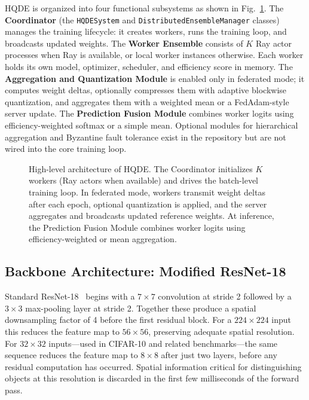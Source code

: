\documentclass[journal,twoside]{IEEEtran}
\newcommand{\hqde}{\mbox{HQDE}\xspace}
\begin{document}
\hqde{} is organized into four functional subsystems as shown in
Fig.~\ref{fig:arch}. The \textbf{Coordinator} (the \texttt{HQDESystem}
and \texttt{DistributedEnsembleManager} classes) manages the training
lifecycle: it creates workers, runs the training loop, and broadcasts
updated weights. The \textbf{Worker Ensemble} consists of $K$ Ray actor
processes when Ray is available, or local worker instances otherwise.
Each worker holds its own model, optimizer, scheduler, and efficiency
score in memory. The \textbf{Aggregation and Quantization Module} is
enabled only in federated mode; it computes weight deltas, optionally
compresses them with adaptive blockwise quantization, and aggregates them
with a weighted mean or a FedAdam-style server update. The
\textbf{Prediction Fusion Module} combines worker logits using
efficiency-weighted softmax or a simple mean. Optional modules for
hierarchical aggregation and Byzantine fault tolerance exist in the
repository but are not wired into the core training loop.

\begin{figure}[!t]
\centering
\vspace{4.5cm}
\caption{High-level architecture of \hqde{}. The Coordinator initializes
$K$ workers (Ray actors when available) and drives the batch-level
training loop. In federated mode, workers transmit weight deltas after
each epoch, optional quantization is applied, and the server aggregates
and broadcasts updated reference weights. At inference, the Prediction
Fusion Module combines worker logits using efficiency-weighted or mean
aggregation.}
\label{fig:arch}
\end{figure}

\subsection{Backbone Architecture: Modified ResNet-18}

Standard ResNet-18~\cite{he2016resnet} begins with a $7\times7$
convolution at stride 2 followed by a $3\times3$ max-pooling layer at
stride 2. Together these produce a spatial downsampling factor of 4
before the first residual block. For a $224\times224$ input this
reduces the feature map to $56\times56$, preserving adequate spatial
resolution. For $32\times32$ inputs---used in CIFAR-10 and related
benchmarks---the same sequence reduces the feature map to $8\times8$
after just two layers, before any residual computation has occurred.
Spatial information critical for distinguishing objects at this
resolution is discarded in the first few milliseconds of the forward
pass.
\end{document}
